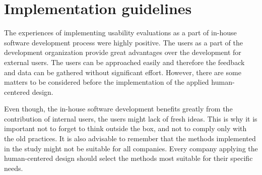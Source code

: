 \documentclass[12pt,a4paper,oneside,pdftex]{report}
\begin{document}








\section{Implementation guidelines}
\label{sec:implementationguidelines}

The experiences of implementing usability evaluations as a part of in-house software development process were highly positive. The users as a part of the development organization provide great advantages over the development for external users. The users can be approached easily and therefore the feedback and data can be gathered without significant effort. However, there are some matters to be considered before the implementation of the applied human-centered design. 

Even though, the in-house software development benefits greatly from the contribution of internal users, the users might lack of fresh ideas. This is why it is important not to forget to think outside the box, and not to comply only with the old practices.  
It is also advisable to remember that the methods implemented in the study might not be suitable for all companies. Every company applying the human-centered design should select the methods most suitable for their specific needs. 
\end{document}
